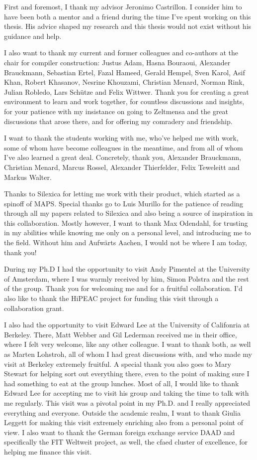 First and foremost, I thank my advisor Jeronimo Castrillon.
I consider him to have been both a mentor and a friend during the time I've spent working on this thesis.
His advice shaped my research and this thesis would not exist without his guidance and help.

I also want to thank my current and former colleagues and co-authors at the chair for compiler construction:
Justus Adam, Hasna Bouraoui, Alexander Brauckmann, Sebastian Ertel, Fazal Hameed, Gerald Hempel, Sven Karol, Asif Khan, Robert Khasanov, Nesrine Khouzami, Christian Menard, Norman Rink, Julian Robledo, Lars Schütze and Felix Wittwer.
Thank you for creating a great environment to learn and work together, for countless discussions and insights, for your patience with my insistance on going to Zeltmensa and the great discussions that arose there, and for offering my comradery and friendship. 

I want to thank the students working with me, who've helped me with work, some of whom have become colleagues in the meantime, and from all of whom I've also learned a great deal.
Concretely, thank you, Alexander Brauckmann, Christian Menard, Marcus Rossel, Alexander Thierfelder, Felix Teweleitt and Markus Walter.

Thanks to Silexica for letting me work with their product, which started as a spinoff of \ac{MAPS}.
Special thanks go to Luis Murillo for the patience of reading through all my papers related to Silexica and also being a source of inspiration in this collaboration. 
Mostly however, I want to thank Max Odendahl, for trusting in my abilities while knowing me only on a personal level, and introducing me to the field.
Without him and Aufw\"{a}rts Aachen, I would not be where I am today, thank you! 

During my Ph.D I had the opportunity to visit Andy Pimentel at the University of Amsterdam, where I was warmly received by him, Simon Polstra and the rest of the group.
Thank you for welcoming me and for a fruitful collaboration. I'd also like to thank the HiPEAC project for funding this visit through a collaboration grant.

I also had the opportunity to visit Edward Lee at the University of Califonria at Berkeley. There, Matt Webber and Gil Lederman received me in their office, where I felt very welcome, like any other colleague.
I want to thank both, as well as Marten Lohstroh, all of whom I had great discussions with, and who made my visit at Berkeley extremely fruitful.
A special thank you also goes to Mary Stewart for helping sort out everything there, even to the point of making sure I had something to eat at the group lunches. 
Most of all, I would like to thank Edward Lee for accepting me to visit his group and taking the time to talk with me regularly.
This visit was a pivotal point in my Ph.D. and I really appreciated everything and everyone.
Outside the academic realm, I want to thank Giulia Leggett for making this visit extremely enriching also from a personal point of view.
I also want to thank the German foreign exchange service DAAD and specifically the FIT Weltweit project, as well, the \ac{cfaed} cluster of excellence, for helping me finance this visit.

